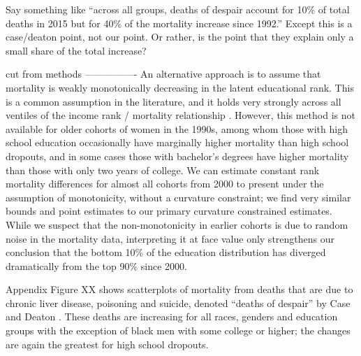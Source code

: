 \begin{center}
Say something like ``across all groups, deaths of despair account for
10\% of total deaths in 2015 but for 40\% of the mortality increase
since 1992.''  Except this is a case/deaton point, not our point.  Or
rather, is the point that they explain only a small share of the total increase?


cut from methods
----------------
An alternative approach is to assume that mortality is weakly
monotonically decreasing in the latent educational rank. This is a
common assumption in the literature, and it holds very strongly across
all ventiles of the income rank / mortality relationship
\cite{Chetty2016b}. However, this method is not available for older
cohorts of women in the 1990s, among whom those with high school
education occasionally have marginally higher mortality than high
school dropouts, and in some cases those with bachelor's degrees have
higher mortality than those with only two years of college. We can
estimate constant rank mortality differences for almost all cohorts
from 2000 to present under the assumption of monotonicity, without a
curvature constraint; we find very similar bounds and point estimates
to our primary curvature constrained estimates. While we suspect that
the non-monotonicity in earlier cohorts is due to random noise in
the mortality data, interpreting it at face value only strengthens
our conclusion that the bottom 10\% of the education distribution has
diverged dramatically from the top 90\% since 2000.


Appendix Figure XX shows scatterplots of mortality from deaths that
are due to chronic liver disease, poisoning and suicide, denoted
``deaths of despair'' by Case and Deaton
\cite{Case2015,Case2017}. These deaths are increasing for all
races, genders and education groups with the exception of black men
with some college or higher; the changes are again the greatest for
high school dropouts.




\end{center}

